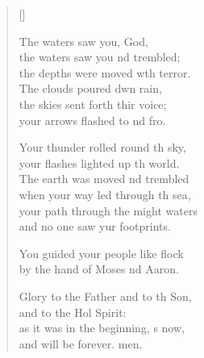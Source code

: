 \begin{verse}[\versewidth]
\begin{patverse}
The waters saw you,  God,\Med\\
the waters saw you nd trembled;\\
the depths were moved w\pointup{\i}th terror.\Med\\
The clouds poured dwn rain,\\
the skies sent forth thir voice;\Med\\
your arrows flashed to nd fro.

Your thunder rolled round th sky,\Med\\
your flashes lighted up th world.\\
The earth was moved nd trembled\Med\\
when your way led through th sea,\\
your path through the might waters\Med\\
and no one saw yur footprints.

You guided your people like  flock\Med\\
by the hand of Moses nd Aaron.

Glory to the Father and to th Son,\Med\\
and to the Hol Spirit:\\
as it was in the beginning, \pointup{\i}s now,\Med\\
and will be forever. men.
  \end{patverse}
\end{verse}
